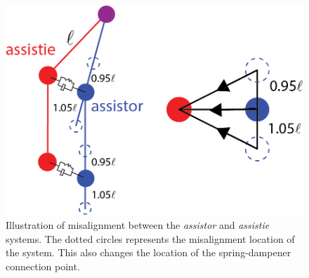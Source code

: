 \begin{figure}
    \centering
    \includegraphics{images/controllers/alignment_comparison.png}
    \caption{Illustration of misalignment between the  \textit{assistor} and  \textit{assistie} systems. The dotted circles represents the misalignment location of the system. This also changes the location of the spring-dampener connection point.  }
    \label{fig:misalignmentIllistration}
\end{figure}

